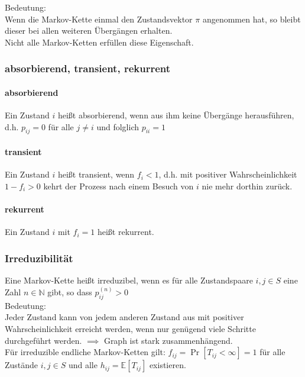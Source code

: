 \documentclass[a4paper,9pt]{extarticle}
\begin{document}
Bedeutung: \\
Wenn die Markov-Kette einmal den Zustandsvektor $\pi$ angenommen hat, so bleibt dieser bei allen weiteren Übergängen erhalten. \\

Nicht alle Markov-Ketten erfüllen diese Eigenschaft.

\subsubsection*{absorbierend, transient, rekurrent}
\paragraph*{absorbierend}
Ein Zustand $i$ heißt absorbierend, wenn aus ihm keine Übergänge herausführen, d.h. $p_{ij} = 0$ für alle $j ≠ i$ und folglich $p_{ii} = 1$

\paragraph*{transient}
Ein Zustand $i$ heißt transient, wenn $f_i < 1$, d.h. mit positiver Wahrscheinlichkeit $1 - f_i > 0$ kehrt der Prozess nach einem Besuch von $i$ nie mehr dorthin zurück.

\paragraph*{rekurrent}
Ein Zustand $i$ mit $f_i = 1$ heißt rekurrent.

\subsubsection*{Irreduzibilität}
Eine Markov-Kette heißt irreduzibel, wenn es für alle Zustandspaare $i, j \in S$ eine Zahl $n \in \mathbb{N}$ gibt, so dass $p_{ij}^{(n)} > 0$ \\

Bedeutung: \\
Jeder Zustand kann von jedem anderen Zustand aus mit positiver Wahrscheinlichkeit erreicht werden, wenn nur genügend viele Schritte durchgeführt werden. $\implies$ Graph ist stark zusammenhängend. \\

Für irreduzible endliche Markov-Ketten gilt: $f_{ij} = \Pr[T_{ij} < ∞] = 1$ für alle Zustände $i, j \in S$ und alle $h_{ij} = \mathbb{E}[T_{ij}]$ existieren. \\
\end{document}
